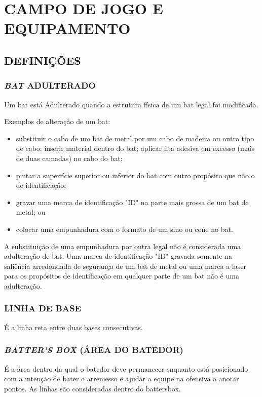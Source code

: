 \chapter{CAMPO DE JOGO E EQUIPAMENTO}

\minitoc%

\section{DEFINIÇÕES}
\subsection{\textit{BAT} ADULTERADO}

Um \gls{bat} está Adulterado quando a estrutura física de um \gls{bat} legal foi modificada.


\begin{exemplo}
	Exemplos de alteração de um \gls{bat}:
	\begin{itemize}
		\item substituir o cabo de um \gls{bat} de metal por um cabo de madeira ou outro tipo de cabo; inserir material dentro do \gls{bat}; aplicar fita adesiva em excesso (mais de duas camadas) no cabo do \gls{bat};
		\item pintar a superfície superior ou inferior do \gls{bat} com outro propósito que não o de identificação;
		\item gravar uma marca de identificação "ID" na parte mais grossa de um \gls{bat} de metal; ou
		\item colocar uma empunhadura com o formato de um sino ou cone no \gls{bat}.
	\end{itemize}
\end{exemplo}

A substituição de uma empunhadura por outra legal não é considerada uma adulteração de \gls{bat}.
Uma marca de identificação "ID" gravada  somente na saliência arredondada de segurança de um \gls{bat} de metal ou uma  marca a laser para os propósitos de identificação em qualquer parte de um \gls{bat} não é uma adulteração.

\subsection{LINHA DE BASE}
É a linha reta entre duas bases consecutivas.

\subsection{\textit{BATTER'S BOX} (ÁREA DO BATEDOR)}
É a área dentro da qual o batedor deve permanecer enquanto está posicionado com a intenção de bater o arremesso e ajudar a equipe na ofensiva a anotar pontos. As linhas são consideradas dentro do \gls{battersbox}.

